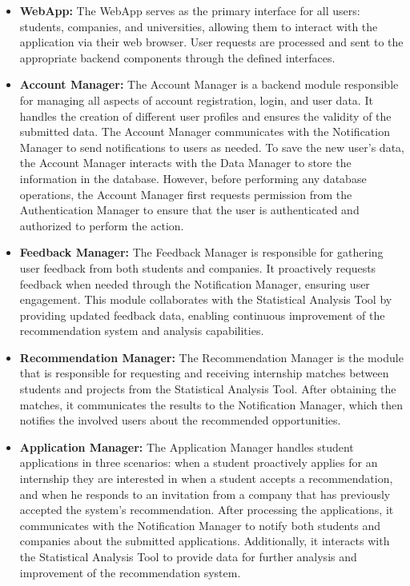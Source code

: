 \begin{itemize}
    \item \textbf{WebApp:} The WebApp serves as the primary interface for all users: students, companies, and universities, allowing them to interact with the application via their web browser. User requests are processed and sent to the appropriate backend components through the defined interfaces.
    \item \textbf{Account Manager:} The Account Manager is a backend module responsible for managing all aspects of account registration, login, and user data. It handles the creation of different user profiles and ensures the validity of the submitted data. The Account Manager communicates with the Notification Manager to send notifications to users as needed. To save the new user's data, the Account Manager interacts with the Data Manager to store the information in the database. However, before performing any database operations, the Account Manager first requests permission from the Authentication Manager to ensure that the user is authenticated and authorized to perform the action.
    \item \textbf{Feedback Manager:} The Feedback Manager is responsible for gathering user feedback from both students and companies. It proactively requests feedback when needed through the Notification Manager, ensuring user engagement. This module collaborates with the Statistical Analysis Tool by providing updated feedback data, enabling continuous improvement of the recommendation system and analysis capabilities.
    \item \textbf{Recommendation Manager:} The Recommendation Manager is the module that is responsible for requesting and receiving internship matches between students and projects from the Statistical Analysis Tool. After obtaining the matches, it communicates the results to the Notification Manager, which then notifies the involved users about the recommended opportunities.
    \item \textbf{Application Manager:} The Application Manager handles student applications in three scenarios: when a student proactively applies for an internship they are interested in when a student accepts a recommendation, and when he responds to an invitation from a company that has previously accepted the system's recommendation. After processing the applications, it communicates with the Notification Manager to notify both students and companies about the submitted applications. Additionally, it interacts with the Statistical Analysis Tool to provide data for further analysis and improvement of the recommendation system.

\end{itemize}
